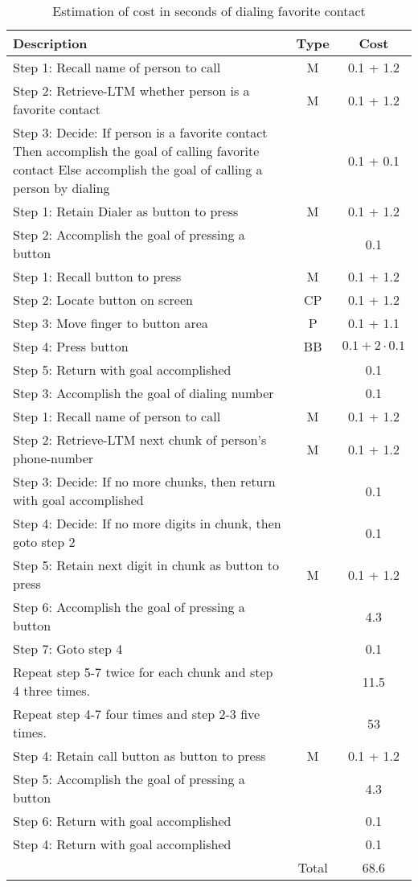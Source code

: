 \begin{enumerate}
\begin{table}
\begin{tabularx}{\textwidth}{@{} Y c c @{}}
\toprule
Description & Type & Cost\\
\midrule
Step 1: Recall name of person to call & M & 0.1 + 1.2 \\
Step 2: Retrieve-LTM whether person is a favorite contact & M & 0.1 + 1.2 \\
Step 3: Decide: If person is a favorite contact Then accomplish the goal of calling favorite contact Else accomplish the goal of calling a person by dialing & & 0.1 + 0.1\\
\quad Step 1: Retain Dialer as button to press & M & 0.1 + 1.2\\
\quad Step 2: Accomplish the goal of pressing a button & & 0.1\\
\quad\quad Step 1: Recall button to press & M & 0.1 + 1.2\\
\quad\quad Step 2: Locate button on screen & CP & 0.1 + 1.2\\
\quad\quad Step 3: Move finger to button area & P & 0.1 + 1.1\\
\quad\quad Step 4: Press button & BB & $0.1 + 2 \cdot 0.1$\\
\quad\quad Step 5: Return with goal accomplished & & 0.1\\
\quad Step 3: Accomplish the goal of dialing number & & 0.1\\
\quad\quad Step 1: Recall name of person to call & M & 0.1 + 1.2\\
\quad\quad Step 2: Retrieve-LTM next chunk of person's phone-number & M & 0.1 + 1.2\\
\quad\quad Step 3: Decide: If no more chunks, then return with goal accomplished & & 0.1\\
\quad\quad Step 4: Decide: If no more digits in chunk, then goto step 2 & & 0.1\\
\quad\quad Step 5: Retain next digit in chunk as button to press & M & 0.1 + 1.2\\
\quad\quad Step 6: Accomplish the goal of pressing a button & & 4.3\\
\quad\quad Step 7: Goto step 4 & & 0.1\\
\quad\quad Repeat step 5-7 twice for each chunk and step 4 three times. & & 11.5\\
\quad\quad Repeat step 4-7 four times and step 2-3 five times. & & 53\\
\quad Step 4: Retain call button as button to press & M & 0.1 + 1.2\\
\quad Step 5: Accomplish the goal of pressing a button & & 4.3\\
\quad Step 6: Return with goal accomplished & & 0.1\\
Step 4: Return with goal accomplished & & 0.1\\
\midrule
& Total & 68.6\\
\bottomrule
\end{tabularx}
\caption{Estimation of cost in seconds of dialing favorite contact}
\label{table:dial}
\end{table}


\end{enumerate}
